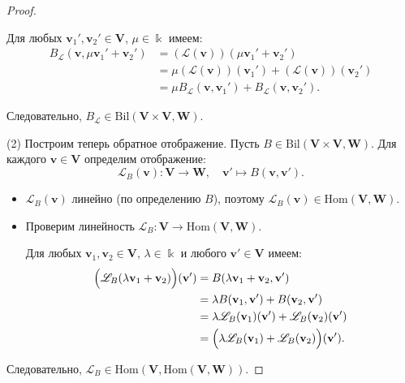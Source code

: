 \begin{proof}
\begin{itemize}
        Для любых $\mathbf{v}_1', \mathbf{v}_2' \in \mathbf{V}$, $\mu \in \Bbbk$ имеем:
        \[
            \begin{split}
                B_{\mathscr{L}}(\mathbf{v}, \mu\mathbf{v}_1' + \mathbf{v}_2')
                &= (\mathscr{L}(\mathbf{v}))(\mu\mathbf{v}_1' + \mathbf{v}_2') \\
                &= \mu(\mathscr{L}(\mathbf{v}))(\mathbf{v}_1') + (\mathscr{L}(\mathbf{v}))(\mathbf{v}_2') \\
                &= \mu B_{\mathscr{L}}(\mathbf{v}, \mathbf{v}_1') + B_{\mathscr{L}}(\mathbf{v}, \mathbf{v}_2').
            \end{split}
        \]
    \end{itemize}
    Следовательно, $B_{\mathscr{L}} \in \mathrm{Bil}(\mathbf{V}\times \mathbf{V}, \mathbf{W})$.

(2) Построим теперь обратное отображение. Пусть $B \in \mathrm{Bil}(\mathbf{V}\times \mathbf{V}, \mathbf{W})$. Для каждого $\mathbf{v} \in \mathbf{V}$ определим отображение:
    \[
        \mathscr{L}_B(\mathbf{v}): \mathbf{V} \to \mathbf{W}, \quad \mathbf{v}' \mapsto B(\mathbf{v}, \mathbf{v}').
    \]
    \begin{itemize}
        \item $\mathscr{L}_B(\mathbf{v})$ линейно (по определению $B$), поэтому $\mathscr{L}_B(\mathbf{v}) \in \mathrm{Hom}(\mathbf{V}, \mathbf{W})$.
        \item Проверим линейность $\mathscr{L}_B: \mathbf{V} \to \mathrm{Hom}(\mathbf{V}, \mathbf{W})$.
        
        Для любых $\mathbf{v}_1, \mathbf{v}_2 \in \mathbf{V}$, $\lambda \in \Bbbk$ и любого $\mathbf{v}' \in \mathbf{V}$ имеем:
        \[
            \begin{split}
                \Bigl(\mathscr{L}_B(\lambda\mathbf{v}_1 + \mathbf{v}_2)\Bigr)(\mathbf{v}')
                &= B(\lambda\mathbf{v}_1 + \mathbf{v}_2, \mathbf{v}') \\
                &= \lambda B(\mathbf{v}_1, \mathbf{v}') + B(\mathbf{v}_2, \mathbf{v}') \\
                &= \lambda \mathscr{L}_B(\mathbf{v}_1)(\mathbf{v}') + \mathscr{L}_B(\mathbf{v}_2)(\mathbf{v}') \\
                &= \Bigl(\lambda \mathscr{L}_B(\mathbf{v}_1) + \mathscr{L}_B(\mathbf{v}_2)\Bigr)(\mathbf{v}').
            \end{split}
        \]
    \end{itemize}
    Следовательно, $\mathscr{L}_B \in \mathrm{Hom}(\mathbf{V}, \mathrm{Hom}(\mathbf{V}, \mathbf{W}))$.
    

\end{proof}
